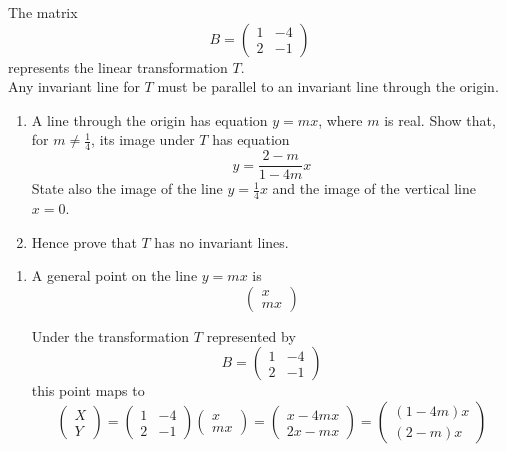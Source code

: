 \documentclass[leqno]{article}
\begin{document}
\begin{enumerate}[
  label=\textbf{\arabic*.},
  leftmargin=*,
  topsep=0pt,
  partopsep=0pt,
  parsep=0pt
]
The matrix
\[
B = \begin{pmatrix} 1 & -4 \\ 2 & -1 \end{pmatrix}
\]
represents the linear transformation $T$. \\
Any invariant line for $T$ must be parallel to an invariant line through the origin. \\
\begin{enumerate}[label=\textbf{(\alph*)}]
  \item A line through the origin has equation $y=mx$, where $m$ is real. Show that, for $m \ne \tfrac{1}{4}$, its image under $T$ has equation
  \[
  y = \frac{2-m}{1-4m}x
  \]
  State also the image of the line $y=\tfrac{1}{4}x$ and the image of the vertical line $x=0$. \\
  \item Hence prove that $T$ has no invariant lines.  \\
\end{enumerate}

\vspace*{30pt}

\begin{tcolorbox}[colback=white, colframe=scarlet, title={\textbf{Solution}}, breakable, grow to left by=6mm, grow to right by=10mm]
\begin{enumerate}[label=\textbf{(\alph*)}]
  \item A general point on the line \(y=mx\) is
\[
\begin{pmatrix}x\\mx\end{pmatrix}
\]

Under the transformation \(T\) represented by
\[
B=\begin{pmatrix}1&-4\\2&-1\end{pmatrix}
\]
this point maps to
\[
\begin{pmatrix}X\\Y\end{pmatrix}
=
\begin{pmatrix}1&-4\\2&-1\end{pmatrix}
\begin{pmatrix}x\\mx\end{pmatrix}
=
\begin{pmatrix}x-4mx\\2x-mx\end{pmatrix}
=
\begin{pmatrix}(1-4m)x\\(2-m)x\end{pmatrix}
\]


\end{enumerate}
\end{tcolorbox}
\end{enumerate}
\end{document}
